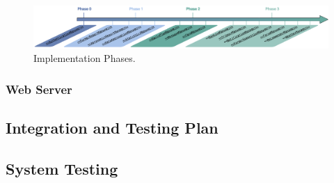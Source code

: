 \begin{figure}[hbt!]
\centering
\includegraphics[width=\textwidth]{../images_diagrams/dd/implementation_phases.png}
\caption{Implementation Phases.}
\label{fig:implementationPhases}
\end{figure}

\subsubsection{Web Server}
\begin{flushleft}

\end{flushleft}

\subsection{Integration and Testing Plan} \label{sect:ITP}
\subsection{System Testing}